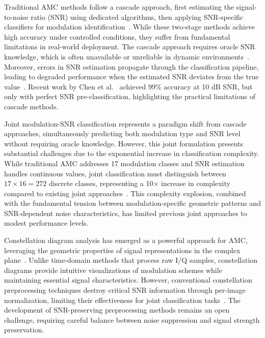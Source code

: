\documentclass{ELSP}
\begin{document}
Traditional AMC methods follow a cascade approach, first estimating the signal-to-noise ratio (SNR) using dedicated algorithms, then applying SNR-specific classifiers for modulation identification~\cite{zhang2023multimodal,chen2024preclassification}. While these two-stage methods achieve high accuracy under controlled conditions, they suffer from fundamental limitations in real-world deployment. The cascade approach requires oracle SNR knowledge, which is often unavailable or unreliable in dynamic environments~\cite{wang2024wctformer}. Moreover, errors in SNR estimation propagate through the classification pipeline, leading to degraded performance when the estimated SNR deviates from the true value~\cite{pauluzzi2000comparison}. Recent work by Chen et al.~\cite{chen2024preclassification} achieved 99\% accuracy at 10 dB SNR, but only with perfect SNR pre-classification, highlighting the practical limitations of cascade methods.

Joint modulation-SNR classification represents a paradigm shift from cascade approaches, simultaneously predicting both modulation type and SNR level without requiring oracle knowledge. However, this joint formulation presents substantial challenges due to the exponential increase in classification complexity. While traditional AMC addresses 17 modulation classes and SNR estimation handles continuous values, joint classification must distinguish between $17 \times 16 = 272$ discrete classes, representing a 10× increase in complexity compared to existing joint approaches~\cite{liu2022jointsnr}. This complexity explosion, combined with the fundamental tension between modulation-specific geometric patterns and SNR-dependent noise characteristics, has limited previous joint approaches to modest performance levels.

Constellation diagram analysis has emerged as a powerful approach for AMC, leveraging the geometric properties of signal representations in the complex plane~\cite{peng2023constellation,gao2023robust}. Unlike time-domain methods that process raw I/Q samples, constellation diagrams provide intuitive visualizations of modulation schemes while maintaining essential signal characteristics. However, conventional constellation preprocessing techniques destroy critical SNR information through per-image normalization, limiting their effectiveness for joint classification tasks~\cite{meng2018automatic,tu2019deep}. The development of SNR-preserving preprocessing methods remains an open challenge, requiring careful balance between noise suppression and signal strength preservation.
\end{document}
